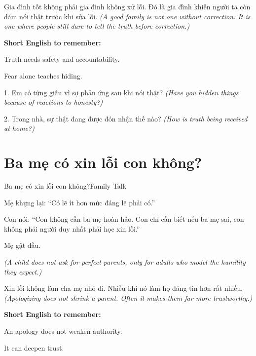 \begin{baihoc}
Gia đình tốt không phải gia đình không xử lỗi. Đó là gia đình khiến người ta còn dám nói thật trước khi sửa lỗi.
\textit{(A good family is not one without correction. It is one where people still dare to tell the truth before correction.)}
\end{baihoc}

\begin{ghinhoanh}
\textbf{Short English to remember:}

Truth needs safety and accountability.

Fear alone teaches hiding.
\end{ghinhoanh}

\begin{tuhocnhanh}
1. Em có từng giấu vì sợ phản ứng sau khi nói thật? \textit{(Have you hidden things because of reactions to honesty?)}

2. Trong nhà, sự thật đang được đón nhận thế nào? \textit{(How is truth being received at home?)}
\end{tuhocnhanh}
\ngancach

\section{Ba mẹ có xin lỗi con không?}
\begin{truyen}{Ba mẹ có xin lỗi con không?}{Family Talk}

Mẹ khựng lại: ``Có lẽ ít hơn mức đáng lẽ phải có.''

Con nói: ``Con không cần ba mẹ hoàn hảo. Con chỉ cần biết nếu ba mẹ sai, con không phải người duy nhất phải học xin lỗi.''

Mẹ gật đầu.

\textit{(A child does not ask for perfect parents, only for adults who model the humility they expect.)}
\end{truyen}

\begin{baihoc}
Xin lỗi không làm cha mẹ nhỏ đi. Nhiều khi nó làm họ đáng tin hơn rất nhiều.
\textit{(Apologizing does not shrink a parent. Often it makes them far more trustworthy.)}
\end{baihoc}

\begin{ghinhoanh}
\textbf{Short English to remember:}

An apology does not weaken authority.

It can deepen trust.
\end{ghinhoanh}

